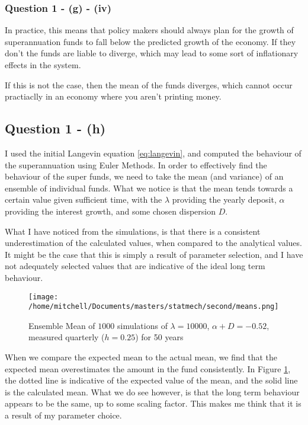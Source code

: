 \documentclass[11pt,a4paper]{article}
\begin{document}
\subsubsection{Question 1 - (g) - (iv)}
\label{sec:question1:subsec:partg:subsub:iv}
In practice, this means that policy makers should always plan for the growth of superannuation funds to fall below the predicted growth of the economy. If they don't the funds are liable to diverge, which may lead to some sort of inflationary effects in the system. 

If this is not the case, then the mean of the funds diverges, which cannot occur practiaclly in an economy where you aren't printing money.
\subsection{Question 1 - (h)}
\label{sec:question1:subsec:parth}
I used the initial Langevin equation \eqref{eq:langevin}, and computed the behaviour of the superannuation using Euler Methods. In order to effectively find the behaviour of the super funds, we need to take the mean (and variance) of an ensemble of individual funds. What we notice is that the mean tends towards a certain value given sufficient time, with the $\lambda$ providing the yearly deposit, $\alpha$ providing the interest growth, and some chosen dispersion $D$. 

What I have noticed from the simulations, is that there is a consistent underestimation of the calculated values, when compared to the analytical values. It might be the case that this is simply a result of parameter selection, and I have not adequately selected values that are indicative of the ideal long term behaviour. 
\begin{figure}[H]
  \centering
  \texttt{[image: /home/mitchell/Documents/masters/statmech/second/means.png]}
  \caption{Ensemble Mean of $1000$ simulations of $\lambda = 10000$, $ \alpha + D = -0.52 $, measured quarterly ($h = 0.25$) for 50 years}
  \label{fig:ensemble_mean}
\end{figure}
\par When we compare the expected mean to the actual mean, we find that the expected mean overestimates the amount in the fund consistently. In Figure \ref{fig:ensemble_mean}, the dotted line is indicative of the expected value of the mean, and the solid line is the calculated mean. What we do see however, is that the long term behaviour appears to be the same, up to some scaling factor. This makes me think that it is a result of my parameter choice.
\end{document}
